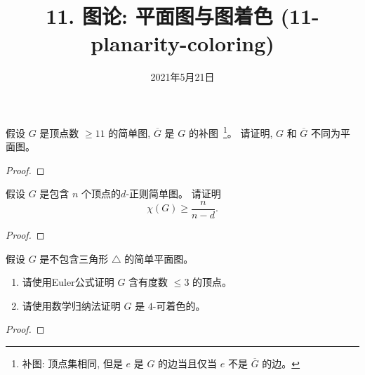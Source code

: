 \documentclass[a4paper, justified]{tufte-handout}
\title{11. 图论: 平面图与图着色 (11-planarity-coloring)}
\date{2021年5月21日}
\begin{document}
\maketitle
\noplagiarism %
\begin{abstract}
\end{abstract}
\beginrequired

\begin{problem}
  假设 $G$ 是顶点数 $\ge 11$ 的简单图, $\overline{G}$ 是 $G$ 的补图~\footnote{
    补图: 顶点集相同, 但是 $e$ 是 $G$ 的边当且仅当 $e$ 不是 $\overline{G}$ 的边。
  }。
  请证明, $G$ 和 $\overline{G}$ 不同为平面图。
\end{problem}

\begin{proof}
\end{proof}

\begin{problem}
  假设 $G$ 是包含 $n$ 个顶点的$d$-正则简单图。
  请证明
  \[
    \chi(G) \ge \frac{n}{n-d}.
  \]
\end{problem}

\begin{proof}
\end{proof}

\begin{problem}
  假设 $G$ 是不包含三角形 $\triangle$ 的简单平面图。
  \begin{enumerate}[(1)]
    \item 请使用Euler公式证明 $G$ 含有度数 $\le 3$ 的顶点。
    \item 请使用数学归纳法证明 $G$ 是 $4$-可着色的。
  \end{enumerate}
\end{problem}

\begin{proof}
\end{proof}
\end{document}
